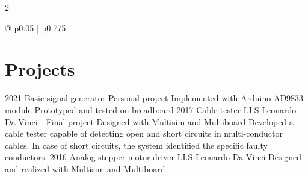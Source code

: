 \documentclass[
	10pt, %
]{FreemanCV}
\begin{document}
\begin{paracol}{2}
{{\begin{supertabular}{@{\hspace{3pt}} p{0.05\linewidth} | p{0.775\linewidth}}
		\end{supertabular}
	}
	\vfill %
}



\section{Projects}


%
\project
	{2021} %
	{Basic signal generator} %
    {Personal project} %
	{Implemented with Arduino AD9833 module} %
    {Prototyped and tested on breadboard} %
%
%
\project
	{2017} %
	{Cable tester} %
    {I.I.S Leonardo Da Vinci - Final project} %
	{Designed with Multisim and Multiboard } %
    {Developed a cable tester capable of detecting open and short circuits in multi-conductor cables. In case of short circuits, the system identified the specific faulty conductors.} %
%
%
\project
	{2016} %
	{Analog stepper motor driver} %
    {I.I.S Leonardo Da Vinci} %
	{} %
    {Designed and realized with Multisim and Multiboard} %
%


\end{paracol}
\end{document}
